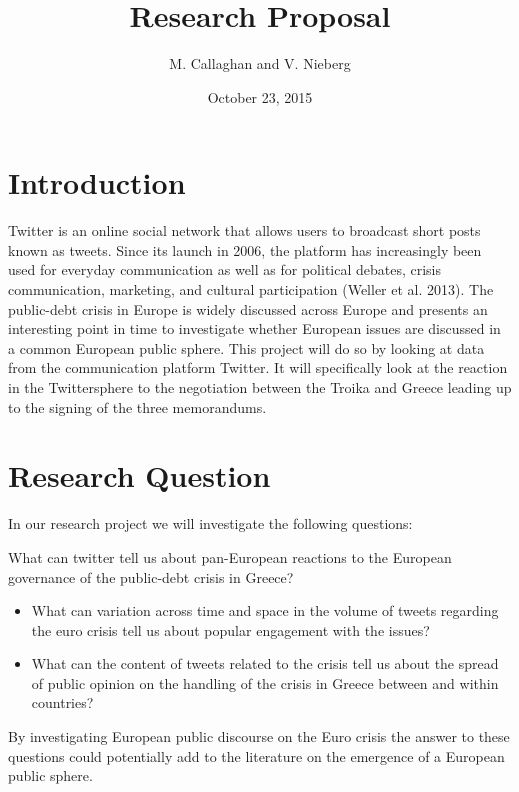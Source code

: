 \documentclass[]{article}
\title{Research Proposal}
\author{M. Callaghan and V. Nieberg}
\date{October 23, 2015}
\begin{document}
\maketitle


{
\hypersetup{linkcolor=black}
\setcounter{tocdepth}{2}
\tableofcontents
}
\newpage

\section{Introduction}\label{introduction}

Twitter is an online social network that allows users to broadcast short
posts known as tweets. Since its launch in 2006, the platform has
increasingly been used for everyday communication as well as for
political debates, crisis communication, marketing, and cultural
participation (Weller et al. 2013). The public-debt crisis in Europe is
widely discussed across Europe and presents an interesting point in time
to investigate whether European issues are discussed in a common
European public sphere. This project will do so by looking at data from
the communication platform Twitter. It will specifically look at the
reaction in the Twittersphere to the negotiation between the Troika and
Greece leading up to the signing of the three memorandums.

\section{Research Question}\label{research-question}

In our research project we will investigate the following questions:

What can twitter tell us about pan-European reactions to the European
governance of the public-debt crisis in Greece?

\begin{itemize}
\item
  What can variation across time and space in the volume of tweets
  regarding the euro crisis tell us about popular engagement with the
  issues?
\item
  What can the content of tweets related to the crisis tell us about the
  spread of public opinion on the handling of the crisis in Greece
  between and within countries?
\end{itemize}

By investigating European public discourse on the Euro crisis the answer
to these questions could potentially add to the literature on the
emergence of a European public sphere.
\end{document}
